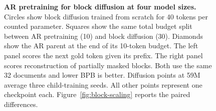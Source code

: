 \begin{figure}[t]
\centering
\resizebox{\textwidth}{!}{}
\caption{\textbf{AR pretraining for block diffusion at four model sizes.} Circles show block diffusion trained from scratch for 40 tokens per counted parameter. Squares show the same total budget split between AR pretraining (10) and block diffusion (30). Diamonds show the AR parent at the end of its 10-token budget. The left panel scores the next gold token given its prefix. The right panel scores reconstruction of partially masked blocks. Both use the same 32 documents and lower BPB is better. Diffusion points at 59M average three child-training seeds. All other points represent one checkpoint each. Figure~\ref{fig:block-scaling} reports the paired differences.}
\label{fig:block-absolute}
\end{figure}

